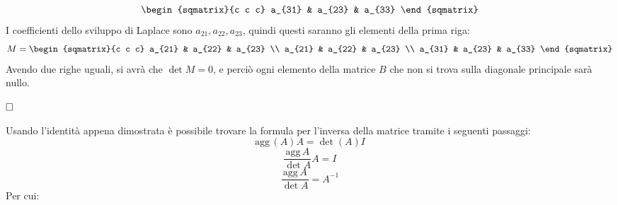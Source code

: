 \begin{newdim}
\[\begin{sqmatrix}{c c c}
            a_{31} & a_{23} & a_{33}
        \end{sqmatrix}
    \]
    I coefficienti dello sviluppo di Laplace sono $a_{21}, a_{22}, a_{23}$, quindi questi saranno gli elementi della prima riga:
    \[
        M = 
        \begin{sqmatrix}{c c c}
            a_{21} & a_{22} & a_{23} \\
            a_{21} & a_{22} & a_{23} \\
            a_{31} & a_{23} & a_{33}
        \end{sqmatrix}
    \]
    Avendo due righe uguali, si avrà che $\det M = 0$, e perciò ogni elemento della matrice $B$ che non si trova sulla diagonale principale sarà nullo.
    
    \hfill$\qedwhite$
\end{newdim}

Usando l'identità appena dimostrata è possibile trovare la formula per l'inversa della matrice tramite i seguenti passaggi:
\[
    \text{agg}\,(A)A = \det(A)I
\]
\[
    \frac{\text{agg}\,A}{\det A}A = I
\]
\[
    \frac{\text{agg}\,A}{\det A} = A^{-1}
\]
Per cui:

